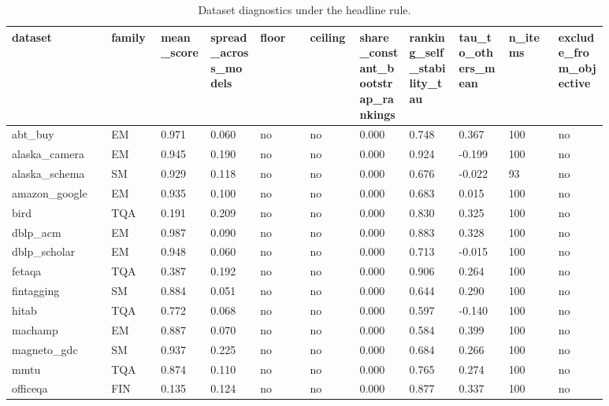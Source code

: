 \begin{landscape}
\tiny
\setlength{\tabcolsep}{3pt}
\begin{longtable}{p{0.147\linewidth}p{0.073\linewidth}p{0.073\linewidth}p{0.073\linewidth}p{0.073\linewidth}p{0.073\linewidth}p{0.073\linewidth}p{0.073\linewidth}p{0.073\linewidth}p{0.073\linewidth}p{0.073\linewidth}}
\caption{Dataset diagnostics under the headline rule.}\label{tab:diagnostics}\\
\toprule
dataset & family & mean\_\allowbreak{}score & spread\_\allowbreak{}across\_\allowbreak{}models & floor & ceiling & share\_\allowbreak{}constant\_\allowbreak{}bootstrap\_\allowbreak{}rankings & ranking\_\allowbreak{}self\_\allowbreak{}stability\_\allowbreak{}tau & tau\_\allowbreak{}to\_\allowbreak{}others\_\allowbreak{}mean & n\_\allowbreak{}items & exclude\_\allowbreak{}from\_\allowbreak{}objective \\
\midrule
abt\_\allowbreak{}buy & EM & 0.971 & 0.060 & no & no & 0.000 & 0.748 & 0.367 & 100 & no \\
alaska\_\allowbreak{}camera & EM & 0.945 & 0.190 & no & no & 0.000 & 0.924 & -0.199 & 100 & no \\
alaska\_\allowbreak{}schema & SM & 0.929 & 0.118 & no & no & 0.000 & 0.676 & -0.022 & 93 & no \\
amazon\_\allowbreak{}google & EM & 0.935 & 0.100 & no & no & 0.000 & 0.683 & 0.015 & 100 & no \\
bird & TQA & 0.191 & 0.209 & no & no & 0.000 & 0.830 & 0.325 & 100 & no \\
dblp\_\allowbreak{}acm & EM & 0.987 & 0.090 & no & no & 0.000 & 0.883 & 0.328 & 100 & no \\
dblp\_\allowbreak{}scholar & EM & 0.948 & 0.060 & no & no & 0.000 & 0.713 & -0.015 & 100 & no \\
fetaqa & TQA & 0.387 & 0.192 & no & no & 0.000 & 0.906 & 0.264 & 100 & no \\
fintagging & SM & 0.884 & 0.051 & no & no & 0.000 & 0.644 & 0.290 & 100 & no \\
hitab & TQA & 0.772 & 0.068 & no & no & 0.000 & 0.597 & -0.140 & 100 & no \\
machamp & EM & 0.887 & 0.070 & no & no & 0.000 & 0.584 & 0.399 & 100 & no \\
magneto\_\allowbreak{}gdc & SM & 0.937 & 0.225 & no & no & 0.000 & 0.684 & 0.266 & 100 & no \\
mmtu & TQA & 0.874 & 0.110 & no & no & 0.000 & 0.765 & 0.274 & 100 & no \\
officeqa & FIN & 0.135 & 0.124 & no & no & 0.000 & 0.877 & 0.337 & 100 & no \\

\end{longtable}
\end{landscape}

